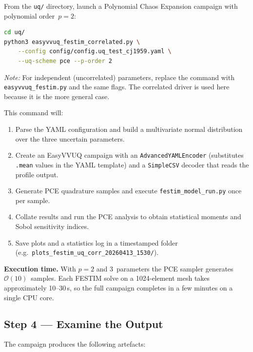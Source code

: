 \documentclass[11pt,a4paper]{article}
\begin{document}
From the \texttt{uq/} directory, launch a Polynomial Chaos Expansion
campaign with polynomial order~$p = 2$:

\begin{lstlisting}[language=bash]
cd uq/
python3 easyvvuq_festim_correlated.py \
    --config config/config.uq_test_cj1959.yaml \
    --uq-scheme pce --p-order 2
\end{lstlisting}

\noindent
\textit{Note:} For independent (uncorrelated) parameters, replace the
command with \texttt{easyvvuq\_festim.py} and the same flags.  The
correlated driver is used here because it is the more general case.

\noindent
This command will:
\begin{enumerate}[nosep]
  \item Parse the YAML configuration and build a multivariate normal
        distribution over the three uncertain parameters.
  \item Create an EasyVVUQ campaign with an \texttt{AdvancedYAMLEncoder}
        (substitutes \texttt{.mean} values in the YAML template) and a
        \texttt{SimpleCSV} decoder that reads the profile output.
  \item Generate PCE quadrature samples and execute
        \texttt{festim\_model\_run.py} once per sample.
  \item Collate results and run the PCE analysis to obtain statistical
        moments and Sobol sensitivity indices.
  \item Save plots and a statistics log in a timestamped folder
        (e.g.\ \texttt{plots\_festim\_uq\_corr\_20260413\_1530/}).
\end{enumerate}

\noindent
\textbf{Execution time.}  With $p = 2$ and 3~parameters the PCE sampler
generates $\mathcal{O}(10)$~samples.  Each FESTIM solve on a 1024-element
mesh takes approximately 10--30\,s, so the full campaign completes in a
few minutes on a single CPU core.

\subsection{Step 4 --- Examine the Output}
\label{sec:tut:output}

The campaign produces the following artefacts:
\end{document}
